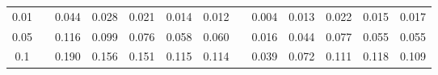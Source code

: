 % 
\begin{tabular}{ccccccccccccc}
  \hline
  \hline
0.01 &  & 0.044 & 0.028 & 0.021 & 0.014 & 0.012 &  & 0.004 & 0.013 & 0.022 & 0.015 & 0.017 \\ 
  0.05 &  & 0.116 & 0.099 & 0.076 & 0.058 & 0.060 &  & 0.016 & 0.044 & 0.077 & 0.055 & 0.055 \\ 
  0.1 &  & 0.190 & 0.156 & 0.151 & 0.115 & 0.114 &  & 0.039 & 0.072 & 0.111 & 0.118 & 0.109 \\ 
   \hline
\end{tabular}
